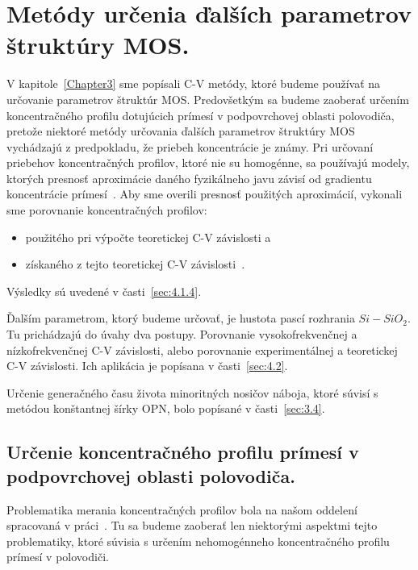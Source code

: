 
\chapter{Metódy určenia ďalších parametrov štruktúry MOS.}\label{Chapter4}

V kapitole~\ref{Chapter3} sme popísali C-V metódy, ktoré budeme
používať na určovanie parametrov štruktúr MOS\@. Predovšetkým sa
budeme zaoberať určením koncentračného profilu dotujúcich prímesí v
podpovrchovej oblasti polovodiča, pretože niektoré metódy určovania
ďalších parametrov štruktúry MOS vychádzajú z predpokladu, že priebeh
koncentrácie je známy. Pri určovaní priebehov koncentračných profilov,
ktoré nie su homogénne, sa používajú modely, ktorých presnosť
aproximácie daného fyzikálneho javu závisí od gradientu koncentrácie
prímesí~\cite{4.1, 4.2, 4.3, 4.4}. Aby sme overili presnosť použitých
aproximácií, vykonali sme porovnanie koncentračných profilov:

\begin{itemize}
\item použitého pri výpočte teoretickej C-V závislosti a
\item získaného z tejto teoretickej C-V závislosti~\cite{4.5}.
\end{itemize}

Výsledky sú uvedené v časti~\ref{sec:4.1.4}.

\par Ďalším parametrom, ktorý budeme určovať, je hustota pascí
rozhrania $Si-SiO_{2}$. Tu prichádzajú do úvahy dva
postupy. Porovnanie vysokofrekvenčnej a nízkofrekvenčnej C-V
závislosti, alebo porovnanie experimentálnej a teoretickej C-V
závislosti. Ich aplikácia je popísana v časti~\ref{sec:4.2}.

\par Určenie generačného času života minoritných nosičov náboja, ktoré
súvisí s metódou konštantnej šírky OPN, bolo popísané v
časti~\ref{sec:3.4}.

\section[Určenie koncentračného profilu prímesí]{Určenie koncentračného profilu prímesí v podpovrchovej oblasti polovodiča.}\label{sec:4.1}

Problematika merania koncentračných profilov bola na našom oddelení
spracovaná v práci~\cite{4.6}. Tu sa budeme zaoberať len niektorými
aspektmi tejto problematiky, ktoré súvisia s určením nehomogénneho
koncentračného profilu prímesí v polovodiči.

